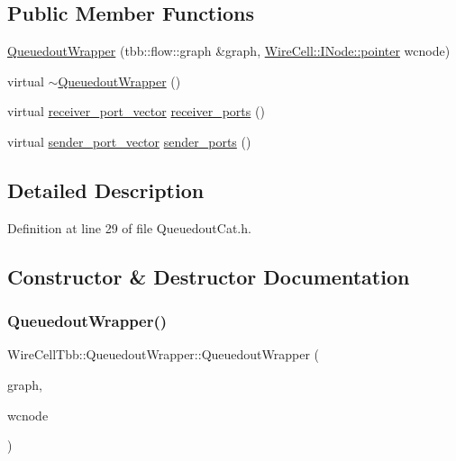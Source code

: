 \subsection*{Public Member Functions}
\begin{DoxyCompactItemize}
\item 
\hyperlink{class_wire_cell_tbb_1_1_queuedout_wrapper_a18fd117cdc038403dca5780796f9b532}{Queuedout\+Wrapper} (tbb\+::flow\+::graph \&graph, \hyperlink{class_wire_cell_1_1_interface_a09c548fb8266cfa39afb2e74a4615c37}{Wire\+Cell\+::\+I\+Node\+::pointer} wcnode)
\item 
virtual \hyperlink{class_wire_cell_tbb_1_1_queuedout_wrapper_a2f9d754c691efe72f4a29010f791b0c5}{$\sim$\+Queuedout\+Wrapper} ()
\item 
virtual \hyperlink{namespace_wire_cell_tbb_a87f42fe8a3ccc3bf9d315cb2d252c7af}{receiver\+\_\+port\+\_\+vector} \hyperlink{class_wire_cell_tbb_1_1_queuedout_wrapper_ad834a6bf647b8ee3126b868f7f37c80f}{receiver\+\_\+ports} ()
\item 
virtual \hyperlink{namespace_wire_cell_tbb_a99272fef0f0c33dc9d4e6e8f777b2e6e}{sender\+\_\+port\+\_\+vector} \hyperlink{class_wire_cell_tbb_1_1_queuedout_wrapper_a3fbda43473c83b36b82fc53de70a9018}{sender\+\_\+ports} ()
\end{DoxyCompactItemize}


\subsection{Detailed Description}


Definition at line 29 of file Queuedout\+Cat.\+h.



\subsection{Constructor \& Destructor Documentation}
\mbox{\label{class_wire_cell_tbb_1_1_queuedout_wrapper_a18fd117cdc038403dca5780796f9b532}} 
\subsubsection{\texorpdfstring{Queuedout\+Wrapper()}{QueuedoutWrapper()}}
{\footnotesize\ttfamily Wire\+Cell\+Tbb\+::\+Queuedout\+Wrapper\+::\+Queuedout\+Wrapper (\begin{DoxyParamCaption}\item[{tbb\+::flow\+::graph \&}]{graph,  }\item[{\hyperlink{class_wire_cell_1_1_interface_a09c548fb8266cfa39afb2e74a4615c37}{Wire\+Cell\+::\+I\+Node\+::pointer}}]{wcnode }\end{DoxyParamCaption})\hspace{0.3cm}{\ttfamily [inline]}}




